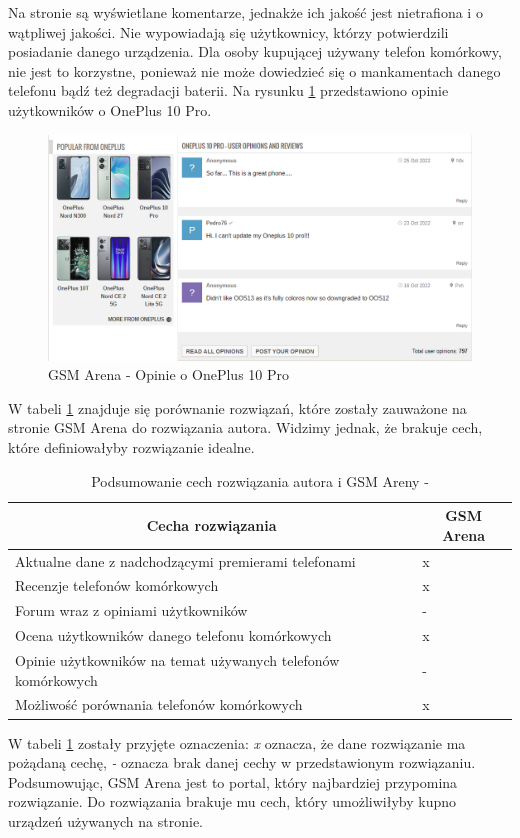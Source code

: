 Na stronie są wyświetlane komentarze, jednakże ich jakość jest nietrafiona i o wątpliwej jakości. Nie wypowiadają się użytkownicy, którzy potwierdzili posiadanie danego urządzenia. Dla osoby kupującej używany telefon komórkowy, nie jest to korzystne, ponieważ nie może dowiedzieć się o mankamentach danego telefonu bądź też degradacji baterii. Na rysunku \ref*{GSM_Arena_5} przedstawiono opinie użytkowników o OnePlus 10 Pro.
\begin{figure}[H]
    \centering
    \includegraphics[scale=0.52]{img/GSM Arena/Comments.png}
    \caption{GSM Arena - Opinie o OnePlus 10 Pro}
    \label{GSM_Arena_5}
\end{figure}

W tabeli \ref*{comparison_gsm_arena} znajduje się porównanie rozwiązań, które zostały zauważone na stronie GSM Arena do rozwiązania autora. Widzimy jednak, że brakuje cech, które definiowałyby rozwiązanie idealne.
\begin{table}[H]
    \centering
    \begin{tabular}{|l|l|}
        \hline
        \multicolumn{1}{|c|}{Cecha rozwiązania} & \multicolumn{1}{c|}{GSM Arena} \\ \hline
        Aktualne dane z nadchodzącymi premierami telefonami & x \\ \hline
        Recenzje telefonów komórkowych & x \\ \hline
        Forum wraz z opiniami użytkowników & - \\ \hline
        Ocena użytkowników danego telefonu komórkowych & x \\ \hline
        Opinie użytkowników na temat używanych telefonów komórkowych & - \\ \hline
        Możliwość porównania telefonów komórkowych & x \\ \hline
    \end{tabular}
    \caption{Podsumowanie cech rozwiązania autora i GSM Areny -}
    \label{comparison_gsm_arena}
\end{table}
W tabeli \ref*{comparison_gsm_arena} zostały przyjęte oznaczenia: \textit{x} oznacza, że dane rozwiązanie ma pożądaną cechę, \textit{-} oznacza brak danej cechy w przedstawionym rozwiązaniu.
Podsumowując, GSM Arena jest to portal, który najbardziej przypomina rozwiązanie. Do rozwiązania brakuje mu cech, który umożliwiłyby kupno urządzeń używanych na stronie.

